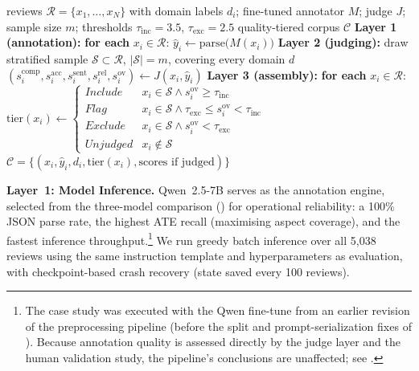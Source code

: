 \documentclass[bdcc,article,submit,moreauthors]{Definitions/mdpi}
\begin{document}
\begin{algorithm}[t]
\caption{Three-layer model-assisted annotation with quality tiering}
\label{alg:pipeline}
\begin{algorithmic}[1]
\Require reviews $\mathcal{R} = \{x_1, \dots, x_N\}$ with domain labels $d_i$; fine-tuned annotator $M$; judge $J$; sample size $m$; thresholds $\tau_{\mathrm{inc}} = 3.5$, $\tau_{\mathrm{exc}} = 2.5$
\Ensure quality-tiered corpus $\mathcal{C}$
\State \textbf{Layer 1 (annotation):} \textbf{for each} $x_i \in \mathcal{R}$: $\hat{y}_i \gets \mathrm{parse}\big(M(x_i)\big)$ 
\State \textbf{Layer 2 (judging):} draw stratified sample $\mathcal{S} \subset \mathcal{R}$, $|\mathcal{S}| = m$, covering every domain $d$
  \State $(s_i^{\mathrm{comp}}, s_i^{\mathrm{acc}}, s_i^{\mathrm{sent}}, s_i^{\mathrm{rel}}, s_i^{\mathrm{ov}}) \gets J(x_i, \hat{y}_i)$ 
\EndFor
\State \textbf{Layer 3 (assembly):} \textbf{for each} $x_i \in \mathcal{R}$:
\State \quad $\mathrm{tier}(x_i) \gets
  \begin{cases}
    \textit{Include} & x_i \in \mathcal{S} \wedge s_i^{\mathrm{ov}} \geq \tau_{\mathrm{inc}} \\
    \textit{Flag}    & x_i \in \mathcal{S} \wedge \tau_{\mathrm{exc}} \leq s_i^{\mathrm{ov}} < \tau_{\mathrm{inc}} \\
    \textit{Exclude} & x_i \in \mathcal{S} \wedge s_i^{\mathrm{ov}} < \tau_{\mathrm{exc}} \\
    \textit{Unjudged} & x_i \notin \mathcal{S}
  \end{cases}$
\State \Return $\mathcal{C} = \{(x_i, \hat{y}_i, d_i, \mathrm{tier}(x_i), \text{scores if judged})\}$
\end{algorithmic}
\end{algorithm}

\textbf{Layer~1: Model Inference.} Qwen~2.5-7B serves as the annotation engine, selected from the three-model comparison () for operational reliability: a 100\% JSON parse rate, the highest ATE recall (maximising aspect coverage), and the fastest inference throughput.\footnote{The case study was executed with the Qwen fine-tune from an earlier revision of the preprocessing pipeline (before the split and prompt-serialization fixes of ). Because annotation quality is assessed directly by the judge layer and the human validation study, the pipeline's conclusions are unaffected; see .} We run greedy batch inference over all 5{,}038 reviews using the same instruction template and hyperparameters as evaluation, with checkpoint-based crash recovery (state saved every 100 reviews).
\end{document}
